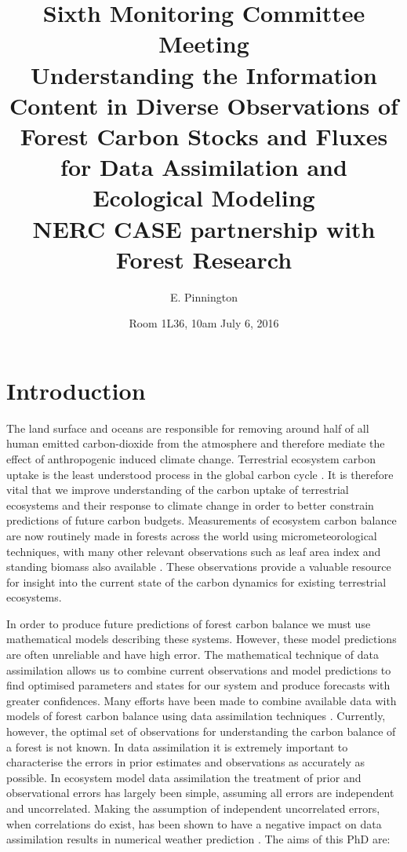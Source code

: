 \documentclass[11pt]{article}
\title{Sixth Monitoring Committee Meeting \\\vspace{4mm} \normalsize{Understanding the Information Content in Diverse Observations of Forest Carbon Stocks and Fluxes for Data Assimilation and Ecological Modeling\\ NERC CASE partnership with Forest Research}}
\author{\normalsize{E. Pinnington}}
\date{\normalsize{Room 1L36, 10am July 6, 2016}}
\begin{document}
\maketitle

\section{Introduction} \label{sec:intro}

The land surface and oceans are responsible for removing around half of all human emitted carbon-dioxide from the atmosphere and therefore mediate the effect of anthropogenic induced climate change. Terrestrial ecosystem carbon uptake is the least understood process in the global carbon cycle \citep{ciais2014carbon}. It is therefore vital that we improve understanding of the carbon uptake of terrestrial ecosystems and their response to climate change in order to better constrain predictions of future carbon budgets. Measurements of ecosystem carbon balance are now routinely made in forests across the world using micrometeorological techniques, with many other relevant observations such as leaf area index and standing biomass also available \citep{baldocchi2008turner}. These observations provide a valuable resource for insight into the current state of the carbon dynamics for existing terrestrial ecosystems. 

In order to produce future predictions of forest carbon balance we must use mathematical models describing these systems. However, these model predictions are often unreliable and have high error. The mathematical technique of data assimilation allows us to combine current observations and model predictions to find optimised parameters and states for our system and produce forecasts with greater confidences. Many efforts have been made to combine available data with models of forest carbon balance using data assimilation techniques \citep{zobitz2011primer, fox2009reflex, richardson2010estimating, Quaife2008, Zobitz2014, Niu2014}. Currently, however, the optimal set of observations for understanding the carbon balance of a forest is not known. In data assimilation it is extremely important to characterise the errors in prior estimates and observations as accurately as possible. In ecosystem model data assimilation the treatment of prior and observational errors has largely been simple, assuming all errors are independent and uncorrelated. Making the assumption of independent uncorrelated errors, when correlations do exist, has been shown to have a negative impact on data assimilation results in numerical weather prediction \citet{smith2009variational, weston2014accounting}. The aims of this PhD are:
\end{document}
